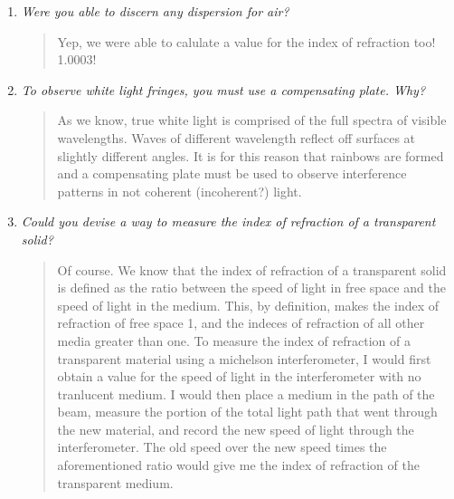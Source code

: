 \documentclass{amsart}
\begin{document}
\begin{enumerate}
\item {\textit{Were you able to discern any dispersion for air?}
\begin{quote}
    Yep, we were able to calulate a value for the index of refraction too! 1.0003!
\end{quote}}

\item{\textit{To observe white light fringes, you must use a compensating plate. Why?}
\begin{quote}
    As we know, true white light is comprised of the full spectra of visible wavelengths. Waves of different wavelength reflect off surfaces at slightly different angles. It is for this reason that rainbows are formed and a compensating plate must be used to observe interference patterns in not coherent (incoherent?) light.
\end{quote}}

\item{\textit{Could you devise a way to measure the index of refraction of a transparent solid?}
\begin{quote}
    Of course. We know that the index of refraction of a transparent solid is defined as the ratio between the speed of light in free space and the speed of light in the medium. This, by definition, makes the index of refraction of free space 1, and the indeces of refraction of all other media greater than one. To measure the index of refraction of a transparent material using a michelson interferometer, I would first obtain a value for the speed of light in the interferometer with no tranlucent medium. I would then place a medium in the path of the beam, measure the portion of the total light path that went through the new material, and record the new speed of light through the interferometer. The old speed over the new speed times the aforementioned ratio would give me the index of refraction of the transparent medium.
\end{quote}}

\end{enumerate}
\end{document}
